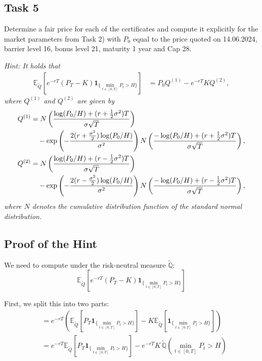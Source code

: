 \documentclass{article}
\begin{document}
\subsection*{Task 5}
Determine a fair price for each of the certificates and compute it explicitly for the market parameters from Task 2) with $P_0$ equal to the price quoted on 14.06.2024, barrier level 16, bonus level 21, maturity 1 year and Cap 28.

\textit{Hint: It holds that}
\begin{align}
\mathbb{E}_{\tilde{Q}}\left[e^{-rT}(P_T - K)\mathbf{1}_{\{\min_{t \in [0,T]} P_t > H\}}\right] &= P_0 Q^{(1)} - e^{-rT}K Q^{(2)},
\end{align}
\textit{where $Q^{(1)}$ and $Q^{(2)}$ are given by}
\begin{align}
Q^{(1)} &= N\left(\frac{\log(P_0/H) + (r + \frac{1}{2}\sigma^2)T}{\sigma\sqrt{T}}\right) \notag\\
&\quad - \exp\left(-\frac{2(r + \frac{\sigma^2}{2})\log(P_0/H)}{\sigma^2}\right) N\left(\frac{-\log(P_0/H) + (r + \frac{1}{2}\sigma^2)T}{\sigma\sqrt{T}}\right),\\
Q^{(2)} &= N\left(\frac{\log(P_0/H) + (r - \frac{1}{2}\sigma^2)T}{\sigma\sqrt{T}}\right) \notag\\
&\quad - \exp\left(-\frac{2(r - \frac{\sigma^2}{2})\log(P_0/H)}{\sigma^2}\right) N\left(\frac{-\log(P_0/H) + (r - \frac{1}{2}\sigma^2)T}{\sigma\sqrt{T}}\right),
\end{align}
\textit{where $N$ denotes the cumulative distribution function of the standard normal distribution.}

\subsection*{Proof of the Hint}

We need to compute under the risk-neutral measure $\tilde{\mathbb{Q}}$:
\begin{equation}
\mathbb{E}_{\tilde{Q}}\left[e^{-rT}(P_T - K)\mathbf{1}_{\{\min_{t \in [0,T]} P_t > H\}}\right]
\end{equation}

First, we split this into two parts:
\begin{align}
&= e^{-rT}\left(\mathbb{E}_{\tilde{Q}}\left[P_T \mathbf{1}_{\{\min_{t \in [0,T]} P_t > H\}}\right] - K\mathbb{E}_{\tilde{Q}}\left[\mathbf{1}_{\{\min_{t \in [0,T]} P_t > H\}}\right]\right)\\
&= e^{-rT}\mathbb{E}_{\tilde{Q}}\left[P_T \mathbf{1}_{\{\min_{t \in [0,T]} P_t > H\}}\right] - e^{-rT}K\,\tilde{\mathbb{Q}}\left(\min_{t \in [0,T]} P_t > H\right)
\end{align}
\end{document}
